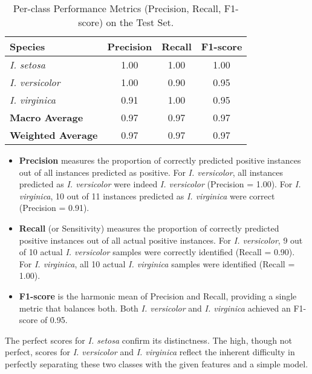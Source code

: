 \documentclass[12pt,a4paper]{article}
\begin{document}
	\begin{table}[h!]
		\centering
		\caption{Per-class Performance Metrics (Precision, Recall, F1-score) on the Test Set.}
		\label{tab:perclassmetrics}
		\begin{tabular}{@{}lccc@{}}
			\toprule
			\textbf{Species} & \textbf{Precision} & \textbf{Recall} & \textbf{F1-score} \\ \midrule
			\textit{I. setosa} & 1.00 & 1.00 & 1.00 \\
			\textit{I. versicolor} & 1.00 & 0.90 & 0.95 \\
			\textit{I. virginica} & 0.91 & 1.00 & 0.95 \\ \midrule
			\textbf{Macro Average} & 0.97 & 0.97 & 0.97 \\ %
			\textbf{Weighted Average} & 0.97 & 0.97 & 0.97 \\ %
			\bottomrule
		\end{tabular}
	\end{table}
	
	\begin{itemize}
		\item \textbf{Precision} measures the proportion of correctly predicted positive instances out of all instances predicted as positive. For \textit{I. versicolor}, all instances predicted as \textit{I. versicolor} were indeed \textit{I. versicolor} (Precision = 1.00). For \textit{I. virginica}, 10 out of 11 instances predicted as \textit{I. virginica} were correct (Precision = 0.91).
		\item \textbf{Recall} (or Sensitivity) measures the proportion of correctly predicted positive instances out of all actual positive instances. For \textit{I. versicolor}, 9 out of 10 actual \textit{I. versicolor} samples were correctly identified (Recall = 0.90). For \textit{I. virginica}, all 10 actual \textit{I. virginica} samples were identified (Recall = 1.00).
		\item \textbf{F1-score} is the harmonic mean of Precision and Recall, providing a single metric that balances both. Both \textit{I. versicolor} and \textit{I. virginica} achieved an F1-score of 0.95.
	\end{itemize}
	The perfect scores for \textit{I. setosa} confirm its distinctness. The high, though not perfect, scores for \textit{I. versicolor} and \textit{I. virginica} reflect the inherent difficulty in perfectly separating these two classes with the given features and a simple model.
	
\end{document}
